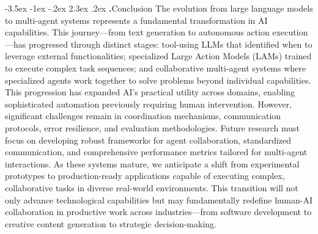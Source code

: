 \documentclass[journal,twoside,10pt]{IEEEtran}
\makeatletter
\renewcommand\section{\@startsection{section}{1}{\z@}%
                       {-3.5ex \@plus -1ex \@minus -.2ex}%
                       {2.3ex \@plus.2ex}%
                       {\normalfont\Large\bfseries\Roman{section}.\quad}}
\makeatother
\begin{document}
\section{Conclusion}
The evolution from large language models to multi-agent systems represents a fundamental transformation in AI capabilities. This journey—from text generation to autonomous action execution—has progressed through distinct stages: tool-using LLMs that identified when to leverage external functionalities; specialized Large Action Models (LAMs) trained to execute complex task sequences; and collaborative multi-agent systems where specialized agents work together to solve problems beyond individual capabilities.
This progression has expanded AI's practical utility across domains, enabling sophisticated automation previously requiring human intervention. However, significant challenges remain in coordination mechanisms, communication protocols, error resilience, and evaluation methodologies. Future research must focus on developing robust frameworks for agent collaboration, standardized communication, and comprehensive performance metrics tailored for multi-agent interactions.
As these systems mature, we anticipate a shift from experimental prototypes to production-ready applications capable of executing complex, collaborative tasks in diverse real-world environments. This transition will not only advance technological capabilities but may fundamentally redefine human-AI collaboration in productive work across industries—from software development to creative content generation to strategic decision-making.



 
\end{document}
